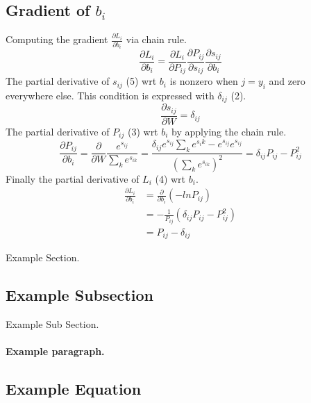 \documentclass[12pt, letter]{article}
\begin{document}
\subsection{Gradient of $b_i$}
Computing the gradient $\frac{\partial L_i}{\partial b_i}$ via chain rule.
\begin{equation}\nonumber
  \frac{\partial L_i}{\partial b_i} =
  \frac{\partial L_i}{\partial P_{ij}} \frac{\partial P_{ij}}{\partial s_{ij}} \frac{\partial s_{ij}}{\partial b_i}
\end{equation}
The partial derivative of $s_{ij}$ (5) wrt $b_i$ is nonzero when $j=y_i$
and zero everywhere else. This condition is expressed with $\delta_{ij}$ (2).
\begin{equation}\nonumber
  \frac{\partial s_{ij}}{\partial W} = \delta_{ij}
\end{equation}
The partial derivative of $P_{ij}$ (3) wrt $b_i$ by applying the chain rule.
\begin{equation}\nonumber
  \frac{\partial P_{ij}}{\partial b_i} = \frac{\partial}{\partial W}\frac{e^{s_{ij}}}{\sum_ke^{s_{ik}}} = \frac{\delta_{ij} e^{s_{ij}} \sum_ke^{s_ik}-e^{s_{ij}}e^{s_{ij}}}{\left(\sum_ke^{s_{ik}}\right)^2} = \delta_{ij}P_{ij}-P_{ij}^2
\end{equation}
Finally the partial derivative of $L_i$ (4) wrt $b_i$.
\begin{equation}
\begin{split}
  \frac{\partial L_i}{\partial b_i}& = \frac{\partial}{\partial b_i}\left(-lnP_{ij}\right)\\
  & = -\frac{1}{P_{ij}} (\delta_{ij}P_{ij}-P_{ij}^2) \\
  & = P_{ij} - \delta_{ij}
\end{split}
\end{equation}


\pagebreak

Example Section.

\subsection{Example Subsection}

Example Sub Section.

\paragraph{Example paragraph.}


\subsection{Example  Equation}
\end{document}
